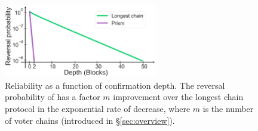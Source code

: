 


\begin{figure}
\begin{center}
\includegraphics[width=0.6\textwidth]{figures/reliability-depth.pdf}
\end{center}
    \caption[Reliability as a function of confirmation depth.]{\label{fig:rd} Reliability as a function of confirmation depth. The reversal probability of \prism has a factor $m$ improvement over the longest chain protocol in the exponential rate of decrease, where $m$ is the number of voter chains (introduced in \S\ref{sec:overview}).}
\end{figure}
